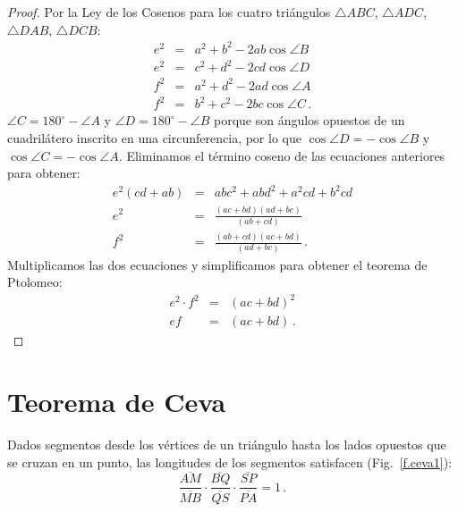 \begin{proof}
Por la Ley de los Cosenos para los cuatro triángulos $\triangle ABC$, $\triangle ADC$, $\triangle DAB$, $\triangle DCB$:
\begin{eqnarray*}
e^2 &=& a^2 + b^2 - 2ab \cos \angle B\\
e^2 &=& c^2 + d^2 - 2cd \cos \angle D\\
f^2 &=& a^2 + d^2 - 2ad \cos \angle A\\
f^2 &=& b^2 + c^2 - 2bc \cos \angle C\,.
\end{eqnarray*}
$\angle C = 180^\circ - \angle A$ y $\angle D = 180^\circ - \angle B$ porque son ángulos opuestos de un cuadrilátero inscrito en una circunferencia, por lo que $\cos \angle D = - \cos \angle B$ y $\cos \angle C = -\cos \angle A$. Eliminamos el término coseno de las ecuaciones anteriores para obtener:
\begin{eqnarray*}
e^2(cd+ab)&=&abc^2+abd^2+a^2cd+b^2cd\\
e^2 &=& \frac{(ac+bd)(ad+bc)}{(ab+cd)}\\
f^2 &=& \frac{(ab+cd)(ac+bd)}{(ad+bc)}\,.
\end{eqnarray*}
Multiplicamos las dos ecuaciones y simplificamos para obtener el teorema de Ptolomeo:
\begin{eqnarray*}
e^2\cdot f^2 &=& (ac+bd)^2\\
ef &=& (ac+bd)\,.
\end{eqnarray*}
\end{proof}


\section{Teorema de Ceva}\label{a.ceva}

\begin{theorem}[Ceva]
Dados segmentos desde los vértices de un triángulo hasta los lados opuestos que se cruzan en un punto, las longitudes de los segmentos satisfacen (Fig.~\ref{f.ceva1}):\label{thm.ceva}
\[
\frac{\overline{AM}}{\overline{MB}}\cdot\frac{\overline{BQ}}{\overline{QS}}\cdot\frac{\overline{SP}}{\overline{PA}} = 1\,.
\]
\end{theorem}

